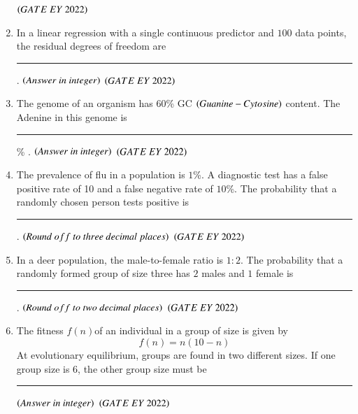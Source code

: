 \documentclass[journal]{IEEEtran}
\numberwithin{equation}{enumi}
\numberwithin{figure}{enumi}
\begin{document}
\begin{enumerate}
    \hfill{$\brak{ GATE\ EY\ 2022}$}
    \bigskip
 \item In a linear regression with a single continuous predictor and $100$ data points, the
residual degrees of freedom are \rule{3cm}{0.15mm} . $\left(Answer\ in\ integer\right)$
    \hfill{$\brak{ GATE\ EY\ 2022}$}
    \bigskip
 \item The genome of an organism has $60$\% GC $\left(Guanine-Cytosine\right)$ content.
The Adenine in this genome is \rule{3cm}{0.15mm} \% . $\left(Answer\ in\ integer\right)$
    \hfill{$\brak{ GATE\ EY\ 2022}$}
    \bigskip
\item The prevalence of flu in a population is $1$\%. A diagnostic test has a false positive rate
of 10 and a false negative rate of $10$\%. The probability that a randomly chosen
person tests positive is \rule{3cm}{0.15mm} . $\brak{Round\ off\ to\ three\ decimal\ places}$
    \hfill{$\brak{ GATE\ EY\ 2022}$}
    \bigskip
 \item In a deer population, the male-to-female ratio is $1 : 2$. The probability that a randomly
formed group of size three has $2$ males and $1$ female is \rule{3cm}{0.15mm} .
$\brak{Round\ off\ to\ two\ decimal\ places}$
    \hfill{$\brak{ GATE\ EY\ 2022}$}
    \bigskip
 \item The fitness $f(n)$of an individual in a group of size is given by 
 \[
 f(n)=n(10-n)
\]
At evolutionary equilibrium, groups are found in two different sizes. If one group size
is $6$, the other group size must be \rule{3cm}{0.15mm}  $\left(Answer\ in\ integer\right)$
    \hfill{$\brak{ GATE\ EY\ 2022}$}
    \bigskip
\end{enumerate}
\end{document}
